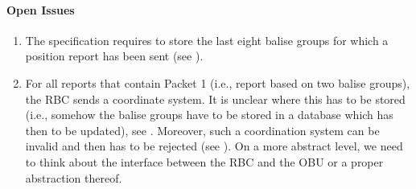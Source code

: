 \paragraph{Open Issues}
\begin{enumerate}
	\item The specification requires to store the last eight balise groups for which a position report has been sent (see \cite[Chapter~3.6.2.2.2.c]{subset-026}).
	\item For all reports that contain Packet 1 (i.e., report based on two balise groups), the RBC sends a coordinate system. It is unclear where this has to be stored (i.e., somehow the balise groups have to be stored in a database which has then to be updated), see \cite[Chapter~3.4.2.3.3.6]{subset-026}. Moreover, such a coordination system can be invalid and then has to be rejected (see \cite[Chapter~3.4.2.3.3.7-8]{subset-026}). On a more abstract level, we need to think about the interface between the RBC and the OBU or a proper abstraction thereof.
\end{enumerate}
